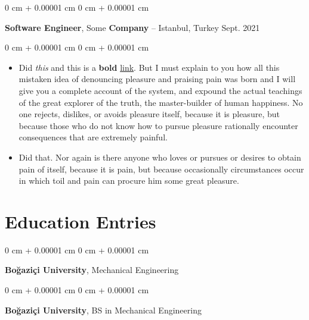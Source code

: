 \documentclass[10pt, letterpaper]{article}
\newenvironment{highlights}{
    \begin{itemize}[
        topsep=0.10 cm,
        parsep=0.10 cm,
        partopsep=0pt,
        itemsep=0pt,
        leftmargin=0 cm + 10pt
    ]
}{
    \end{itemize}
} %
\newenvironment{onecolentry}{
    \begin{adjustwidth}{
        0 cm + 0.00001 cm
    }{
        0 cm + 0.00001 cm
    }
}{
    \end{adjustwidth}
} %
\newenvironment{twocolentry}[2][]{
    \onecolentry
    \def\secondColumn{#2}
    \setcolumnwidth{\fill, 4.5 cm}
    \begin{paracol}{2}
}{
    \switchcolumn \raggedleft \secondColumn
    \end{paracol}
    \endonecolentry
} %
\begin{document}
        \vspace{0.2 cm}

        \begin{twocolentry}{
            Sept. 2021
        }
            \textbf{Software Engineer}, Some \textbf{Company} -- Istanbul, Turkey\end{twocolentry}

        \vspace{0.10 cm}
        \begin{onecolentry}
            \begin{highlights}
                \item Did \textit{this} and this is a \textbf{bold} \href{https://example.com}{link}. But I must explain to you how all this mistaken idea of denouncing pleasure and praising pain was born and I will give you a complete account of the system, and expound the actual teachings of the great explorer of the truth, the master-builder of human happiness. No one rejects, dislikes, or avoids pleasure itself, because it is pleasure, but because those who do not know how to pursue pleasure rationally encounter consequences that are extremely painful.
                \item Did that. Nor again is there anyone who loves or pursues or desires to obtain pain of itself, because it is pain, but because occasionally circumstances occur in which toil and pain can procure him some great pleasure.
            \end{highlights}
        \end{onecolentry}



    
    \section{Education Entries}



        
        \begin{onecolentry}
            \textbf{Boğaziçi University}, Mechanical Engineering\end{onecolentry}



        \vspace{0.2 cm}

        \begin{onecolentry}
            \textbf{Boğaziçi University}, BS in Mechanical Engineering\end{onecolentry}
\end{document}
